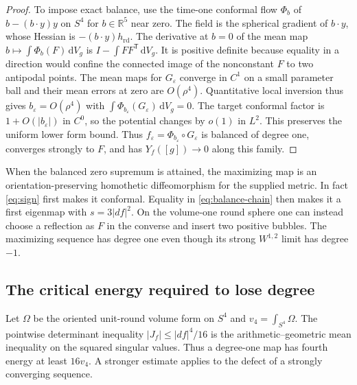\documentclass[11pt]{article}
\numberwithin{equation}{section}
\newcommand{\rd}{\mathrm{rd}}
\newcommand{\dd}{\mathrm{d}}
\newcommand{\e}{\varepsilon}
\newcommand{\RR}{\mathbb{R}}
\newcommand{\abs}[1]{\lvert #1\rvert}
\newcommand{\dv}{\dd V_g}
\newcommand{\Yf}{Y_f([g])}
\begin{document}
\begin{proof}
To impose exact balance, use the time-one conformal flow
\(\Phi_b\) of \(b-(b\cdot y)y\) on \(S^4\) for \(b\in\RR^5\)
near zero. The field is the spherical gradient of \(b\cdot y\),
whose Hessian is \(-(b\cdot y)h_{\rd}\).
The derivative at \(b=0\) of the mean map
\(b\mapsto\int\Phi_b(F)\,\dv\) is
\(I-\int FF^{\mathsf T}\,\dv\). It is positive definite because
equality in a direction would confine the connected image of
the nonconstant \(F\) to two antipodal points.
The mean maps for \(G_\e\) converge in \(C^1\) on a small parameter
ball and their mean errors at zero are \(O(\rho^4)\). Quantitative
local inversion thus gives \(b_\e=O(\rho^4)\) with
\(\int\Phi_{b_\e}(G_\e)\,\dv=0\).
The target conformal factor is \(1+O(\abs{b_\e})\) in \(C^0\),
so the potential changes by \(o(1)\) in \(L^2\). This preserves
the uniform lower form bound. Thus \(f_\e=\Phi_{b_\e}\circ G_\e\)
is balanced of degree one, converges strongly to \(F\), and
has \(\Yf\to0\) along this family.
\end{proof}

When the balanced zero supremum is attained, the maximizing map
is an orientation-preserving homothetic diffeomorphism for the
supplied metric. In fact \eqref{eq:sign} first makes it conformal.
Equality in \eqref{eq:balance-chain} then makes it a first eigenmap
with \(s=3\abs{df}^2\). On the volume-one round sphere one can instead
choose a reflection as \(F\) in the converse and insert two positive
bubbles. The maximizing sequence has degree one even though its
strong \(W^{1,2}\) limit has degree \(-1\).

\subsection{The critical energy required to lose degree}

Let \(\Omega\) be the oriented unit-round volume form on \(S^4\)
and \(v_4=\int_{S^4}\Omega\). The pointwise determinant inequality
\(\abs{J_f}\le\abs{df}^4/16\) is the arithmetic--geometric mean
inequality on the squared singular values. Thus a degree-one map
has fourth energy at least \(16v_4\). A stronger estimate applies
to the defect of a strongly converging sequence.
\end{document}
